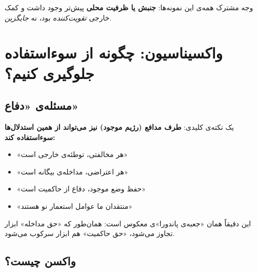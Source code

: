 وجه مشترک همه‌ی این نمونه‌ها: \textbf{جنبش یا ظرفیت محلی} پیش‌تر وجود
داشت و کمک خارجی \textit{تقویت‌کننده} بود، نه \textit{جایگزین}.


\section{واکسیناسیون: چگونه از سوءاستفاده جلوگیری کنیم؟}
\label{sec:ch15-vaccination}

\subsection{مسئله‌ی «دفاع»}

یک نکته‌ی کلیدی: \textbf{طرف مدافع (رژیم موجود) نیز می‌تواند از همین
استدلال‌ها سوءاستفاده کند:}
\begin{itemize}
\item «هر مخالفتی، توطئه‌ی خارجی است»
\item «هر اعتراضی، مداخله‌ی بیگانه است»
\item «حفظ وضع موجود، دفاع از حاکمیت است»
\item «منتقدان ما عوامل استعمار نو هستند»
\end{itemize}

این دقیقاً همان «جعبه‌ی پاندورا»ی معکوس است: همان‌طور که «حق مداخله»
ابزار تجاوز می‌شود، «حق حاکمیت» هم ابزار سرکوب می‌شود.

\subsection{واکسن چیست؟}

